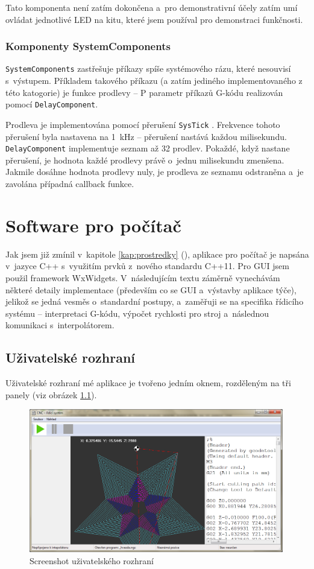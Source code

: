 		Tato komponenta není zatím dokončena a~pro demonstrativní účely zatím umí ovládat jednotlivé LED na kitu, které jsem používal pro demonstraci funkčnosti.
		
		\subsection{Komponenty SystemComponents}
		{\tt SystemComponents} zastřešuje příkazy spíše systémového rázu, které nesouvisí s~výstupem. Příkladem takového příkazu (a zatím jediného implementovaného z této katogorie) je funkce prodlevy -- P parametr příkazů G-kódu\cite{gcode} realizován pomocí {\tt DelayComponent}.
		
		Prodleva je implementována pomocí přerušení {\tt SysTick} \cite{refman}. Frekvence tohoto přerušení byla nastavena na 1~kHz -- přerušení nastává každou milisekundu. {\tt DelayComponent} implementuje seznam až 32 prodlev. Pokaždé, když nastane přerušení, je hodnota každé prodlevy právě o~jednu milisekundu zmenšena. Jakmile dosáhne hodnota prodlevy nuly, je prodleva ze seznamu odstraněna a~je zavolána případná callback funkce.
	

\chapter{Software pro počítač}

	Jak jsem již zmínil v~kapitole \ref{kap:prostredky} (), aplikace pro počítač je napsána v~jazyce C++ s~využitím prvků z~nového standardu C++11. Pro GUI jsem použil framework WxWidgets. V~následujícím textu záměrně vynechávám některé detaily implementace (především co se GUI a~výstavby aplikace týče), jelikož se jedná vesměs o~standardní postupy, a~zaměřuji se na specifika řídicího systému -- interpretaci G-kódu, výpočet rychlosti pro stroj a~následnou komunikaci s~interpolátorem.
	\section{Uživatelské rozhraní}
	Uživatelské rozhraní mé aplikace je tvořeno jedním oknem, rozděleným na tři panely (viz obrázek \ref{obr:okno}).
	\begin{figure}[h]
		\centering
		\includegraphics[width=0.99\textwidth]{img/okno2.png}
		\caption{Screenshot uživatelského rozhraní}\label{obr:okno}	
	\end{figure}
	
